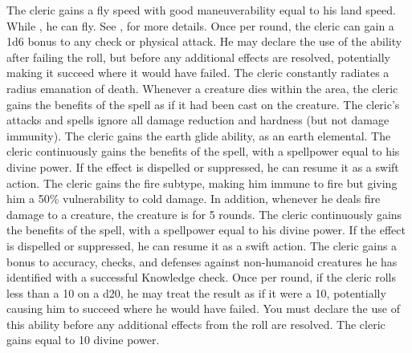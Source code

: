             The cleric gains a fly speed with good maneuverability equal to his land speed.
            While , he can fly.
            See , for more details.
            Once per round, the cleric can gain a \plus1d6 bonus to any check or physical attack.
            He may declare the use of the ability after failing the roll, but before any additional effects are resolved, potentially making it succeed where it would have failed.
            The cleric constantly radiates a \areamed radius emanation of death.
            Whenever a creature dies within the area, the cleric gains the benefits of the  spell as if it had been cast on the creature.
            The cleric's attacks and spells ignore all damage reduction and hardness (but not damage immunity).
            The cleric gains the earth glide ability, as an earth elemental.
             The cleric continuously gains the benefits of the 
            spell, with a spellpower equal to his divine power.
            If the effect is dispelled or suppressed, he can resume it as a swift action.
            The cleric gains the fire subtype, making him immune to fire but giving him a 50\% vulnerability to cold damage.
            In addition, whenever he deals fire damage to a creature, the creature is \ignited for 5 rounds.
             The cleric continuously gains the benefits of the 
            spell, with a spellpower equal to his divine power.
            If the effect is dispelled or suppressed, he can resume it as a swift action.
            The cleric gains a  bonus to accuracy, checks, and defenses against non-humanoid creatures he has identified with a successful Knowledge check.
            Once per round, if the cleric rolls less than a 10 on a d20, he may treat the result as if it were a 10, potentially causing him to succeed where he would have failed.
            You must declare the use of this ability before any additional effects from the roll are resolved.
            The cleric gains  equal to 10 \add divine power.
